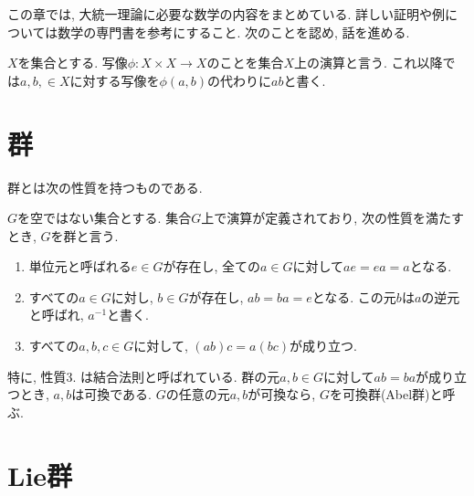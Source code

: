 %
%
 この章では, 大統一理論に必要な数学の内容をまとめている.
 詳しい証明や例については数学の専門書を参考にすること.
 次のことを認め, 話を進める.
 
 $X$を集合とする.
 写像$\phi: X\times X \rightarrow X$のことを集合$X$上の演算と言う.
 これ以降では$a,b,\in X$に対する写像を$\phi(a, b)$の代わりに$ab$と書く.
\section{群}
群とは次の性質を持つものである.
\begin{dfn}[群]
  $G$を空ではない集合とする. 集合$G$上で演算が定義されており, 次の性質を満たすとき, $G$を群と言う.
  \begin{enumerate}
    \item 単位元と呼ばれる$e\in G$が存在し, 全ての$a\in G$に対して$ae=ea=a$となる.
    \item すべての$a\in G$に対し, $b\in G$が存在し, $ab=ba=e$となる. この元$b$は$a$の逆元と呼ばれ, $a^{-1}$と書く.
    \item すべての$a, b, c \in G$に対して, $(ab)c=a(bc)$が成り立つ.
  \end{enumerate}
\end{dfn}
特に, 性質3. は結合法則と呼ばれている.
群の元$a, b\in G$に対して$ab=ba$が成り立つとき, $a, b$は可換である.
$G$の任意の元$a, b$が可換なら, $G$を可換群(Abel群)と呼ぶ.
\section{Lie群}



